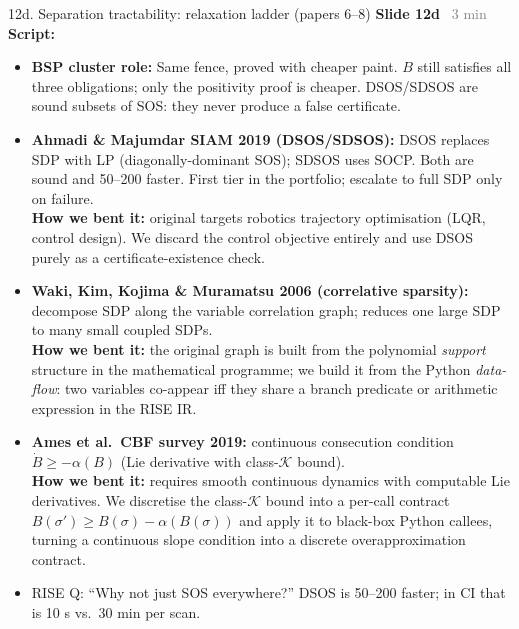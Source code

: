 \documentclass[aspectratio=169]{beamer}
\newcommand{\syncline}[2]{\textbf{#1} \hfill \textcolor{gray}{#2}}
\begin{document}
\begin{frame}[shrink=56]{12d. Separation tractability: relaxation ladder (papers 6--8)}
\syncline{Slide 12d}{~3 min}
\textbf{Script:}
\begin{itemize}
  \item \textbf{BSP cluster role:} Same fence, proved with cheaper paint. \(B\) still satisfies all three obligations; only the positivity proof is cheaper. DSOS/SDSOS are sound subsets of SOS: they never produce a false certificate.
  \item \textbf{Ahmadi \& Majumdar SIAM 2019 (DSOS/SDSOS):} DSOS replaces SDP with LP (diagonally-dominant SOS); SDSOS uses SOCP. Both are sound and 50--200\texttimes{} faster. First tier in the portfolio; escalate to full SDP only on failure.\\
    \textbf{How we bent it:} original targets robotics trajectory optimisation (LQR, control design). We discard the control objective entirely and use DSOS purely as a certificate-existence check.
  \item \textbf{Waki, Kim, Kojima \& Muramatsu 2006 (correlative sparsity):} decompose SDP along the variable correlation graph; reduces one large SDP to many small coupled SDPs.\\
    \textbf{How we bent it:} the original graph is built from the polynomial \emph{support} structure in the mathematical programme; we build it from the Python \emph{data-flow}: two variables co-appear iff they share a branch predicate or arithmetic expression in the RISE IR.
  \item \textbf{Ames et al.\ CBF survey 2019:} continuous consecution condition \(\dot B\ge -\alpha(B)\) (Lie derivative with class-\(\mathcal{K}\) bound).\\
    \textbf{How we bent it:} requires smooth continuous dynamics with computable Lie derivatives. We discretise the class-\(\mathcal{K}\) bound into a per-call contract \(B(\sigma')\ge B(\sigma)-\alpha(B(\sigma))\) and apply it to black-box Python callees, turning a continuous slope condition into a discrete overapproximation contract.
  \item RISE Q: ``Why not just SOS everywhere?'' DSOS is 50--200\texttimes{} faster; in CI that is 10 s vs.\ 30 min per scan.
\end{itemize}
\end{frame}
\end{document}
